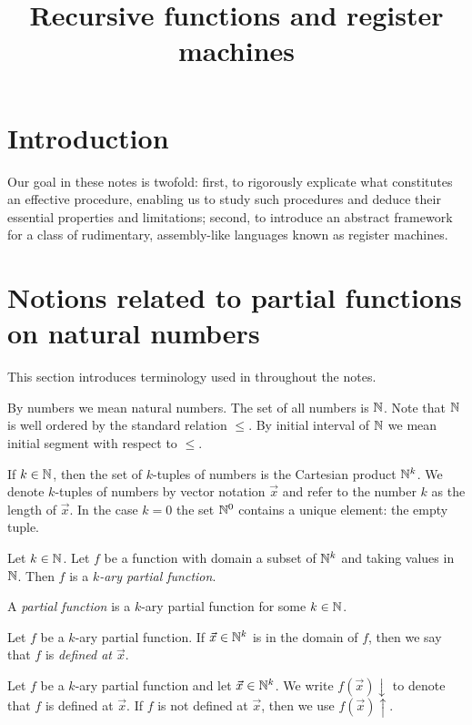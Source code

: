 \documentclass[10pt]{amsart}
\begin{document}
\title{Recursive functions and register machines}
\date{}
\maketitle

\section{Introduction}
\noindent
Our goal in these notes is twofold: first, to rigorously explicate what constitutes an effective procedure, enabling us to study such procedures and deduce their essential properties and limitations; second, to introduce an abstract framework for a class of rudimentary, assembly-like languages known as register machines.

\section{Notions related to partial functions on natural numbers}
\noindent
This section introduces terminology used in throughout the notes.

By numbers we mean natural numbers. The set of all numbers is ${\mathbb N}$. Note that ${\mathbb N}$ is well ordered by the standard relation $\leq$. By initial interval of ${\mathbb N}$ we mean initial segment with respect to $\leq$.

If $k \in {\mathbb N}$, then the set of $k$-tuples of numbers is the Cartesian product ${\mathbb N}^k$. We denote $k$-tuples of numbers by vector notation $\vec{x}$ and refer to the number $k$ as the length of $\vec{x}$. In the case $k = 0$ the set ${\mathbb N}^0$ contains a unique element: the empty tuple.

\begin{definition}
	Let $k\in {\mathbb N}$. Let $f$ be a function with domain a subset of ${\mathbb N}^k$ and taking values in ${\mathbb N}$. Then $f$ is a \textit{$k$-ary partial function}.
\end{definition}

\begin{definition}
	A \textit{partial function} is a $k$-ary partial function for some $k \in {\mathbb N}$.
\end{definition}

\begin{definition}
	Let $f$ be a $k$-ary partial function. If $\vec{x} \in {\mathbb N}^k$ is in the domain of $f$, then we say that $f$ is \textit{defined at $\vec{x}$}.
\end{definition}

\begin{remark}\label{remark:up_and_down_arrows_for_arguments_of_definition}
	Let $f$ be a $k$-ary partial function and let $\vec{x} \in {\mathbb N}^k$. We write $f(\vec{x})\downarrow$ to denote that $f$ is defined at $\vec{x}$. If $f$ is not defined at $\vec{x}$, then we use $f(\vec{x})\uparrow$.
\end{remark}
\end{document}
